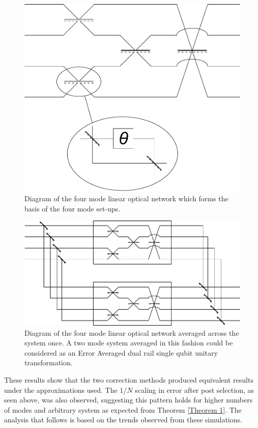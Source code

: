 \documentclass[aps,pra,twocolumn,superscriptaddress,numerical,floatfix]{revtex4-1}
\begin{document}
\begin{figure}[h]
\centerline{\includegraphics[width=\columnwidth]{4_mode_system.pdf}}
\caption{Diagram of the four mode linear optical network which forms the basis of the four mode set-ups. \label{fig:4 mode basis diagram}}
\end{figure}

\begin{figure}[h]
\centerline{\includegraphics[width=\columnwidth]{4_mode_average_across.pdf}}
\caption{Diagram of the four mode linear optical network averaged across the system once. A two mode system averaged in this fashion could be considered as an Error Averaged dual rail single qubit unitary transformation. \label{fig: averaging 4 mode diagram}}
\end{figure}

These results show that the two correction methods produced equivalent results under the approximations used. The $1/N$ scaling in error after post selection, as seen above, was also observed, suggesting this pattern holds for higher numbers of modes and arbitrary system as expected from Theorem \ref{Theorem 1}.  The analysis that follows is based on the trends observed from these simulations.
\end{document}
